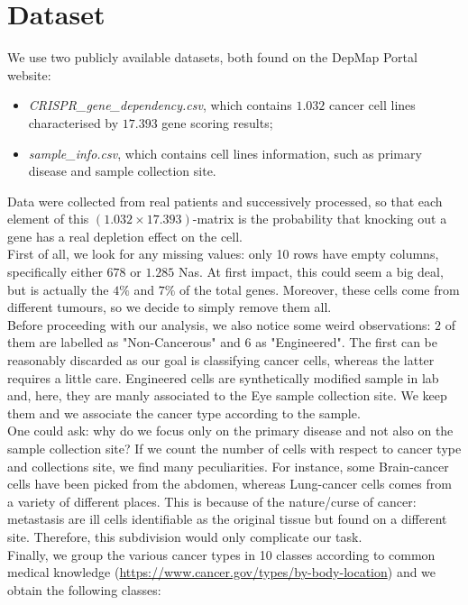 \documentclass[a4paper,11pt, oneside]{article}  %
\begin{document}
\section{Dataset}
We use two publicly available datasets, both found on the DepMap Portal website:
\begin{itemize}
	\item \textit{CRISPR\_gene\_dependency.csv}, which contains $1.032$ cancer cell lines characterised by $17.393$ gene scoring results; \\
	\item \textit{sample\_info.csv}, which contains cell lines information, such as primary disease and sample collection site.
\end{itemize}
Data were collected from real patients and successively processed, so that each element of this $(1.032 \times 17.393)$-matrix is the probability that knocking out a gene has a real depletion effect on the cell. \\
First of all, we look for any missing values: only 10 rows have empty columns, specifically either $678$ or $1.285$ Nas. At first impact, this could seem a big deal, but is actually the $4\%$ and $7\%$  of the total genes. Moreover, these cells come from different tumours, so we decide to simply remove them all.  \\
Before proceeding with our analysis, we also notice some weird observations: $2$ of them are labelled as "Non-Cancerous" and $6$ as "Engineered". The first can be reasonably discarded as our goal is classifying cancer cells, whereas the latter requires a little care. Engineered cells are synthetically modified sample in lab and, here, they are manly associated to the Eye sample collection site. We keep them and we associate the cancer type according to the sample. \\
One could ask: why do we focus only on the primary disease and not also on the sample collection site? If we count the number of cells with respect to cancer type and collections site, we find many peculiarities. For instance, some Brain-cancer cells have been picked from the abdomen, whereas Lung-cancer cells comes from a variety of different places. This is because of the nature/curse of cancer: metastasis are ill cells identifiable as the original tissue but found on a different site. Therefore, this subdivision would only complicate our task.  \\
Finally, we group the various cancer types in 10 classes according to common medical knowledge (\url{https://www.cancer.gov/types/by-body-location}) and we obtain the following classes:
\end{document}

